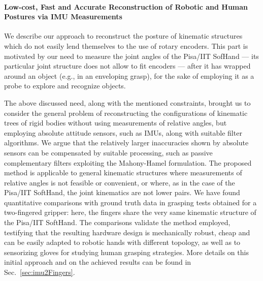 
\paragraph{Low-cost, Fast and Accurate Reconstruction of Robotic and Human Postures via IMU Measurements}
\label{sec:IMUGlove}

We describe our approach to reconstruct the posture of kinematic structures which do not easily lend themselves to the use of rotary encoders. This part is motivated by our need to measure the joint angles of the Pisa/IIT SofHand --- its particular joint structure does not allow to fit encoders ---  after it has wrapped around an object (e.g., in an enveloping grasp), for the sake of employing it as a probe to explore and recognize objects.

The above discussed need, along with the mentioned constraints, brought us to consider the general problem of reconstructing the configurations of kinematic trees of rigid bodies without using measurements of relative angles, but employing absolute attitude sensors, such as IMUs, along with suitable filter algorithms. We argue that the relatively larger inaccuracies shown by absolute sensors can be compensated by suitable processing, such as passive complementary filters exploiting the Mahony-Hamel formulation. The proposed method is applicable to general kinematic structures where measurements of relative angles is not feasible or convenient, or where, as in the case of the Pisa/IIT SoftHand, the joint kinematics are not lower pairs. 
We have found quantitative comparisons with ground truth data in grasping tests obtained for a two-fingered gripper: here, the fingers share the very same kinematic structure of the Pisa/IIT SoftHand. The comparisons validate the method employed, testifying that the resulting hardware design is mechanically robust, cheap and can be easily adapted to robotic hands with different topology, as well as to sensorizing gloves for studying human grasping strategies. More details on this initial approach and on the achieved results can be found in Sec.~\ref{sec:imu2Fingers}. %